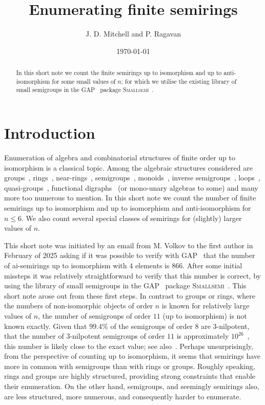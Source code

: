 \documentclass{article}
\title{Enumerating finite semirings}
\author{J. D. Mitchell and P. Ragavan}
\date{\today}
\theoremstyle{definition}
\theoremstyle{plain}
\newcommand{\GAP}{\textsc{GAP}~\cite{GAP4}\xspace}
\newcommand{\Smallsemi}{\textsc{Smallsemi}~\cite{Smallsemi}\xspace}
\begin{document}
\maketitle

\begin{abstract}
  In this short note we count the finite semirings up to isomorphism
  and up to anti-isomorphism for some small values of $n$; for which we
  utilise the existing library of small semigroups in the \GAP
  package \Smallsemi.
\end{abstract}

\section{Introduction}


Enumeration of algebra and combinatorial structures of finite order up to
isomorphism is a classical topic. Among the algebraic structures considered are
groups~\cite{BESCHE2002,}, rings~\cite{Blackburn2022, Fine1993, Kruse1970,
A027623}, near-rings~\cite{SONATA, A305858},
semigroups~\cite{A027851}, monoids~\cite{A058129}, inverse semigroups~\cite{A001428}, loops~\cite{A000315},
quasi-groups~\cite{A002860}, functional digraphs~\cite{A001373} (or mono-unary algebras to
some) and many more too numerous to mention. In this short note we count the
number of finite semirings up to isomorphism and up to isomorphism and
anti-isomorphism for $n \leq 6$. We also count several special classes of
semirings for (slightly) larger values of $n$.

This short note was initiated by an email from M. Volkov to the first author in
February of 2025 asking if it was possible to verify with \GAP that the number
of ai-semirings up to isomorphism with $4$ elements is $866$.
After some initial missteps it was relatively straightforward to verify that
this number is correct, by using the library of small semigroups in the \GAP
package \Smallsemi. This short note arose out from these first steps. In
contrast to groups or rings, where the numbers of non-isomorphic objects of
order $n$ is known for relatively large values of $n$, the number of semigroups
of order $11$ (up to isomorphism) is not known exactly. Given that $99.4\%$ of
the semigroups of order $8$ are $3$-nilpotent, that the number of $3$-nilpotent
semigroups of order $11$ is approximately $10 ^ {26}$~\cite{}, this number is
likely close to the exact value; see also~\cite{}. Perhaps unsurprisingly, from
the perspective of counting up to isomorphism, it seems that semirings have
more in common with semigroups than with rings or groups. Roughly speaking,
rings and groups are highly structured, providing strong constraints that
enable their enumeration. On the other hand, semigroups, and seemingly
semirings also, are less structured, more numerous, and consequently harder to
enumerate.
\end{document}
